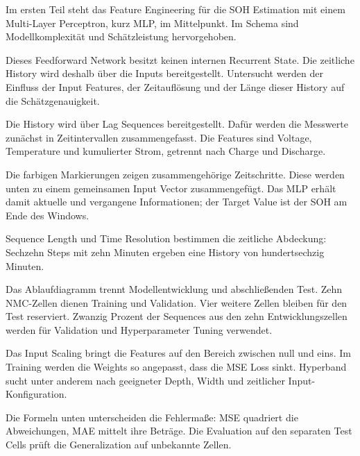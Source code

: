 
\begin{sprechtext}

Im ersten Teil steht das Feature Engineering für die SOH Estimation mit einem Multi-Layer Perceptron, kurz MLP, im Mittelpunkt. Im Schema sind Modellkomplexität und Schätzleistung hervorgehoben.

Dieses Feedforward Network besitzt keinen internen Recurrent State. Die zeitliche History wird deshalb über die Inputs bereitgestellt. Untersucht werden der Einfluss der Input Features, der Zeitauflösung und der Länge dieser History auf die Schätzgenauigkeit.

\end{sprechtext}


\begin{sprechtext}

Die History wird über Lag Sequences bereitgestellt. Dafür werden die Messwerte zunächst in Zeitintervallen zusammengefasst. Die Features sind Voltage, Temperature und kumulierter Strom, getrennt nach Charge und Discharge.

Die farbigen Markierungen zeigen zusammengehörige Zeitschritte. Diese werden unten zu einem gemeinsamen Input Vector zusammengefügt. Das MLP erhält damit aktuelle und vergangene Informationen; der Target Value ist der SOH am Ende des Windows.

Sequence Length und Time Resolution bestimmen die zeitliche Abdeckung: Sechzehn Steps mit zehn Minuten ergeben eine History von hundertsechzig Minuten.

\end{sprechtext}


\begin{sprechtext}

Das Ablaufdiagramm trennt Modellentwicklung und abschließenden Test. Zehn NMC-Zellen dienen Training und Validation. Vier weitere Zellen bleiben für den Test reserviert. Zwanzig Prozent der Sequences aus den zehn Entwicklungszellen werden für Validation und Hyperparameter Tuning verwendet.

Das Input Scaling bringt die Features auf den Bereich zwischen null und eins. Im Training werden die Weights so angepasst, dass die MSE Loss sinkt. Hyperband sucht unter anderem nach geeigneter Depth, Width und zeitlicher Input-Konfiguration.

Die Formeln unten unterscheiden die Fehlermaße: MSE quadriert die Abweichungen, MAE mittelt ihre Beträge. Die Evaluation auf den separaten Test Cells prüft die Generalization auf unbekannte Zellen.

\end{sprechtext}

